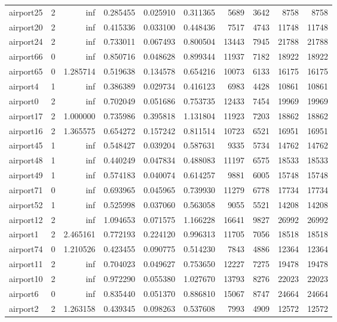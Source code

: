 \begin{longtable}{|l|r|r|r|r|r|r|r|r|r|}
airport25 & 2 & inf & 0.285455 & 0.025910 & 0.311365 & 5689 & 3642 & 8758 & 8758 \\
airport20 & 2 & inf & 0.415336 & 0.033100 & 0.448436 & 7517 & 4743 & 11748 & 11748 \\
airport24 & 2 & inf & 0.733011 & 0.067493 & 0.800504 & 13443 & 7945 & 21788 & 21788 \\
airport66 & 0 & inf & 0.850716 & 0.048628 & 0.899344 & 11937 & 7182 & 18922 & 18922 \\
airport65 & 0 & 1.285714 & 0.519638 & 0.134578 & 0.654216 & 10073 & 6133 & 16175 & 16175 \\
airport4 & 1 & inf & 0.386389 & 0.029734 & 0.416123 & 6983 & 4428 & 10861 & 10861 \\
airport0 & 2 & inf & 0.702049 & 0.051686 & 0.753735 & 12433 & 7454 & 19969 & 19969 \\
airport17 & 2 & 1.000000 & 0.735986 & 0.395818 & 1.131804 & 11923 & 7203 & 18862 & 18862 \\
airport16 & 2 & 1.365575 & 0.654272 & 0.157242 & 0.811514 & 10723 & 6521 & 16951 & 16951 \\
airport45 & 1 & inf & 0.548427 & 0.039204 & 0.587631 & 9335 & 5734 & 14762 & 14762 \\
airport48 & 1 & inf & 0.440249 & 0.047834 & 0.488083 & 11197 & 6575 & 18533 & 18533 \\
airport49 & 1 & inf & 0.574183 & 0.040074 & 0.614257 & 9881 & 6005 & 15748 & 15748 \\
airport71 & 0 & inf & 0.693965 & 0.045965 & 0.739930 & 11279 & 6778 & 17734 & 17734 \\
airport52 & 1 & inf & 0.525998 & 0.037060 & 0.563058 & 9055 & 5521 & 14208 & 14208 \\
airport12 & 2 & inf & 1.094653 & 0.071575 & 1.166228 & 16641 & 9827 & 26992 & 26992 \\
airport1 & 2 & 2.465161 & 0.772193 & 0.224120 & 0.996313 & 11705 & 7056 & 18518 & 18518 \\
airport74 & 0 & 1.210526 & 0.423455 & 0.090775 & 0.514230 & 7843 & 4886 & 12364 & 12364 \\
airport11 & 2 & inf & 0.704023 & 0.049627 & 0.753650 & 12227 & 7275 & 19478 & 19478 \\
airport10 & 2 & inf & 0.972290 & 0.055380 & 1.027670 & 13793 & 8276 & 22023 & 22023 \\
airport6 & 0 & inf & 0.835440 & 0.051370 & 0.886810 & 15067 & 8747 & 24664 & 24664 \\
airport2 & 2 & 1.263158 & 0.439345 & 0.098263 & 0.537608 & 7993 & 4909 & 12572 & 12572 \\

\end{longtable}
